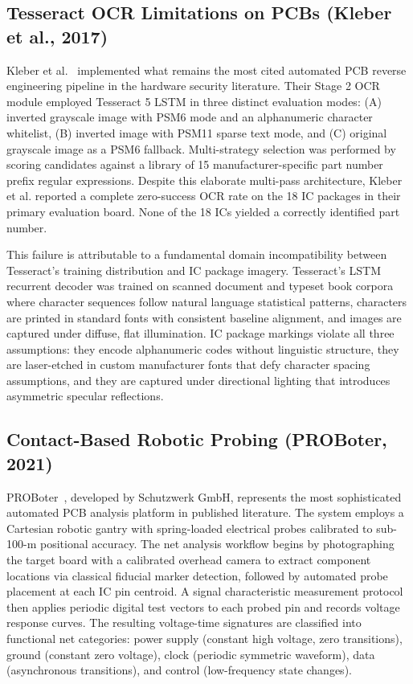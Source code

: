 \documentclass[12pt,a4paper]{report}
\begin{document}
\subsection{Tesseract OCR Limitations on PCBs (Kleber et al., 2017)}
\label{subsec:kleber_ocr}

Kleber et al.~\cite{kleber2017woot} implemented what remains the most cited automated PCB reverse engineering pipeline in the hardware security literature. Their Stage 2 OCR module employed Tesseract 5 LSTM in three distinct evaluation modes: (A) inverted grayscale image with PSM6 mode and an alphanumeric character whitelist, (B) inverted image with PSM11 sparse text mode, and (C) original grayscale image as a PSM6 fallback. Multi-strategy selection was performed by scoring candidates against a library of 15 manufacturer-specific part number prefix regular expressions. Despite this elaborate multi-pass architecture, Kleber et al. reported a complete zero-success OCR rate on the 18 IC packages in their primary evaluation board. None of the 18 ICs yielded a correctly identified part number.

This failure is attributable to a fundamental domain incompatibility between Tesseract's training distribution and IC package imagery. Tesseract's LSTM recurrent decoder was trained on scanned document and typeset book corpora where character sequences follow natural language statistical patterns, characters are printed in standard fonts with consistent baseline alignment, and images are captured under diffuse, flat illumination. IC package markings violate all three assumptions: they encode alphanumeric codes without linguistic structure, they are laser-etched in custom manufacturer fonts that defy character spacing assumptions, and they are captured under directional lighting that introduces asymmetric specular reflections.

\subsection{Contact-Based Robotic Probing (PROBoter, 2021)}
\label{subsec:proboter}

PROBoter~\cite{weber2021proboter}, developed by Schutzwerk GmbH, represents the most sophisticated automated PCB analysis platform in published literature. The system employs a Cartesian robotic gantry with spring-loaded electrical probes calibrated to sub-100-\textmu m positional accuracy. The net analysis workflow begins by photographing the target board with a calibrated overhead camera to extract component locations via classical fiducial marker detection, followed by automated probe placement at each IC pin centroid. A signal characteristic measurement protocol then applies periodic digital test vectors to each probed pin and records voltage response curves. The resulting voltage-time signatures are classified into functional net categories: power supply (constant high voltage, zero transitions), ground (constant zero voltage), clock (periodic symmetric waveform), data (asynchronous transitions), and control (low-frequency state changes).
\end{document}
